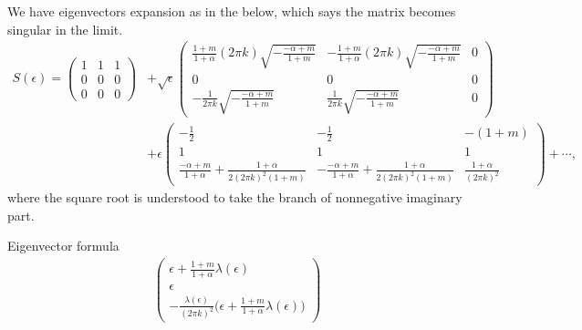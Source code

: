 \documentclass[a4paper,11pt]{article}
\def\blue{\color{blue}}
\theoremstyle{remark}
\begin{document}
We have eigenvectors expansion as in the below, which says the matrix becomes singular in the limit.
\begin{align*}
 S(\epsilon) =
 \begin{pmatrix}
  1 & 1 & 1 \\
  0 & 0 & 0 \\
  0 & 0 & 0
 \end{pmatrix}
 &+\sqrt\epsilon  \begin{pmatrix}
  \frac{1+m}{1+\alpha}(2\pi k) \sqrt{-\frac{-\alpha+m}{1+m}} & -\frac{1+m}{1+\alpha}(2\pi k) \sqrt{-\frac{-\alpha+m}{1+m}} & 0 \\
  0 & 0 & 0 \\
  -\frac{1}{2\pi k}\sqrt{-\frac{-\alpha+m}{1+m}} & \frac{1}{2\pi k}\sqrt{-\frac{-\alpha+m}{1+m}} & 0
 \end{pmatrix}\\
 &+\epsilon\begin{pmatrix}
  - \frac{1}{2} & - \frac{1}{2} & -(1+m) \\
  1 & 1 & 1 \\
  \frac{-\alpha+m}{1+\alpha}+\frac{1+\alpha}{2(2\pi k)^2(1+m)}  & -\frac{-\alpha+m}{1+\alpha} +\frac{1+\alpha}{2(2\pi k)^2(1+m)} & \frac{1+\alpha}{(2\pi k)^2}
 \end{pmatrix}
 + \cdots,
\end{align*}
where the square root is understood to take the branch of nonnegative imaginary part.

{\blue Eigenvector formula
\begin{align*}
 \begin{pmatrix}
  \epsilon+ \frac{1+m}{1+\alpha}\lambda(\epsilon) \\ \epsilon \\ -\frac{\lambda(\epsilon)}{(2\pi k)^2} \Big(\epsilon + \frac{1+m}{1+\alpha}\lambda(\epsilon)\Big)
 \end{pmatrix}
\end{align*}
}
\end{document}
